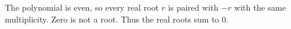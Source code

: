 The polynomial is even, so every real root $r$ is paired with $-r$ with the same multiplicity. Zero is not a root. Thus the real roots sum to $\boxed0$.
